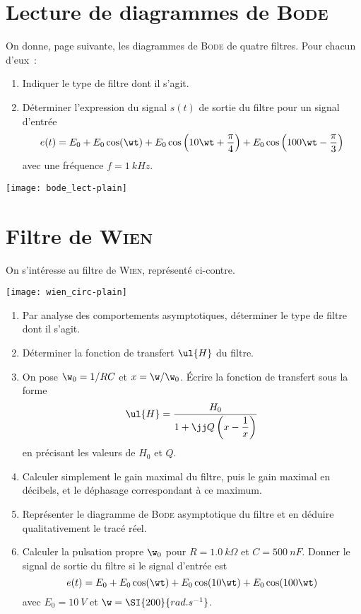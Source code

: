 \documentclass[a4paper, 12pt, final, garamond]{book}
\begin{document}
\section{Lecture de diagrammes de \textsc{Bode}}
On donne, page suivante, les diagrammes de \textsc{Bode} de quatre filtres. Pour
chacun d'eux~:
\begin{enumerate}
    \item Indiquer le type de filtre dont il s'agit.
    \item Déterminer l'expression du signal $s(t)$ de sortie du filtre pour un
        signal d'entrée
        \[e(t) =
            E_0 +
            E_0\cos(\wt) +
            E_0\cos \left( 10\wt + \frac{\pi}{4} \right) +
            E_0\cos \left( 100\wt - \frac{\pi}{3} \right)
        \]
        avec une fréquence $f = \SI{1}{kHz}$.
\end{enumerate}
\begin{center}
    \texttt{[image: bode\_lect-plain]}
\end{center}

\section{Filtre de \textsc{Wien}}
On s'intéresse au filtre de \textsc{Wien}, représenté ci-contre.
\begin{center}
    \texttt{[image: wien\_circ-plain]}
\end{center}

\begin{enumerate}
    \item Par analyse des comportements asymptotiques, déterminer le type de
        filtre dont il s'agit.
    \item Déterminer la fonction de transfert $\ul{H}$ du filtre.
    \item On pose $\w_0 = 1/RC$ et $x=\w/\w_0$. Écrire la fonction de transfert
        sous la forme
        \[ \ul{H} = \frac{H_0}{1 + \jj Q \left( x - \dfrac{1}{x} \right)}\]
        en précisant les valeurs de $H_0$ et $Q$.
    \item Calculer simplement le gain maximal du filtre, puis le gain maximal en
        décibels, et le déphasage correspondant à ce maximum.
    \item Représenter le diagramme de \textsc{Bode} asymptotique du filtre et en
        déduire qualitativement le tracé réel.
    \item Calculer la pulsation propre $\w_0$ pour $R = \SI{1.0}{k\Omega}$ et $C
        = \SI{500}{nF}$. Donner le signal de sortie du filtre si le signal
        d'entrée est
        \[e(t) = E_0 + E_0\cos(\wt) + E_0\cos(10\wt) + E_0\cos(100\wt)\]
        avec $E_0 = \SI{10}{V}$ et $\w = \SI{200}{rad.s^{-1}}$.
\end{enumerate}
\end{document}
